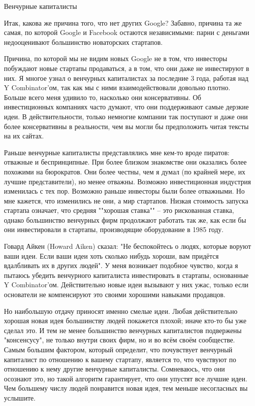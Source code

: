 \documentclass[ebook,12pt,oneside,openany]{memoir}
\begin{document}
Венчурные капиталисты

Итак, какова же причина того, что нет других Google? Забавно, причина
та же самая, по которой Google и Facebook остаются независимыми: парни
с деньгами недооценивают большинство новаторских стартапов.

Причина, по которой мы не видим новых Google не в том, что инвесторы
побуждают новые стартапы продаваться, а в том, что они даже не
инвестируют в них. Я многое узнал о венчурных капиталистах за
последние 3 года, работая над Y Combinator'ом, так как мы с ними
взаимодействовали довольно плотно. Больше всего меня удивило то,
насколько они консервативны. Об инвестиционных компаниях часто думают,
что они поддерживают самые дерзкие идеи. В действительности, только
немногие компании так поступают и даже они более консервативны в
реальности, чем вы могли бы предположить читая тексты на их сайтах.

Раньше венчурные капиталисты представлялись мне кем-то вроде пиратов:
отважные и беспринципные. При более близком знакомстве они оказались
более похожими на бюрократов. Они более честны, чем я думал (по
крайней мере, их лучшие представители), но менее отважны. Возможно
инвестиционная индустрия изменилась с тех пор. Возможно раньше
инвесторы были более отважными. Но мне кажется, что изменились не они,
а мир стартапов. Низкая стоимость запуска стартапа означает, что
средняя ""хорошая ставка"" -- это рискованная ставка, однако
большинство венчурных фирм продолжают работать так же, как если бы они
инвестировали в стартапы, производящие оборудование в 1985 году.

Говард Айкен (Howard Aiken) сказал: "Не беспокойтесь о людях, которые
воруют ваши идеи. Если ваши идеи хоть сколько нибудь хороши, вам
придётся вдалбливать их в других людей". У меня возникает подобное
чувство, когда я пытаюсь убедить венчурного капиталиста инвестировать
в стартапы, основанные Y Combinator'ом. Действительно новые идеи
вызывают у них ужас, только если основатели не компенсируют это своими
хорошими навыками продавцов.

Но наибольшую отдачу приносят именно смелые идеи. Любая действительно
хорошая новая идея большинству людей покажется плохой; иначе кто-то бы
уже сделал это. И тем не менее большинство венчурных капиталистов
подвержены "консенсусу", не только внутри своих фирм, но и во всём
своём сообществе. Самым большим фактором, который определит, что
почувствует венчурный капиталист по отношению к вашему стартапу,
является то, что чувствуют по отношению к нему другие венчурные
капиталисты. Сомневаюсь, что они осознают это, но такой алгоритм
гарантирует, что они упустят все лучшие идеи. Чем большему числу людей
понравится новая идея, тем меньше несогласных вы услышите.
\end{document}
